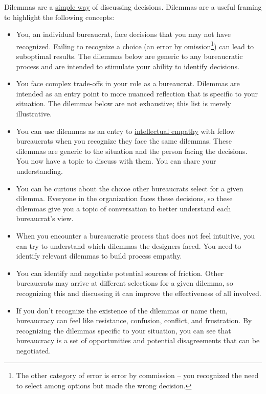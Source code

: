 Dilemmas are a \href{https://en.wikipedia.org/wiki/Defeasible_reasoning}{simple way}
\iftoggle{WPinmargin}{\marginpar{$>$Wikipedia: Defeasible\\reasoning}}{}
of discussing decisions. %
Dilemmas are a useful framing to highlight the following concepts:
\begin{itemize}
    \item You, an individual bureaucrat, face decisions that you may not have recognized. Failing to recognize a choice (an error by omission\footnote{The other category of error is error by commission -- you recognized the need to select among options but made the wrong decision.}) can lead to suboptimal results. The dilemmas below are generic to any bureaucratic process and are intended to stimulate your ability to identify decisions. 
    \item You face complex trade-offs in your role as a bureaucrat. Dilemmas are intended as an entry point to more nuanced reflection that is specific to your situation. The dilemmas below are not exhaustive; this list is merely illustrative. 
    \item You can use dilemmas as an entry to \href{https://en.wikipedia.org/wiki/Theory_of_mind}{intellectual empathy} 
    \iftoggle{WPinmargin}{\marginpar{$>$Wikipedia: Theory\\of mind}}{}
    with fellow bureaucrats when you recognize they face the same dilemmas. These dilemmas are generic to the situation and the person facing the decisions. You now have a topic to discuss with them. You can share your understanding. 
    \item You can be curious about the choice other bureaucrats select for a given dilemma. Everyone in the organization faces these decisions, so these dilemmas give you a topic of conversation to better understand each bureaucrat's view.
    \item When you encounter a bureaucratic process that does not feel intuitive, 
    you can try to understand which dilemmas the designers faced. 
    You need to identify relevant dilemmas to build \gls{process empathy}. \iftoggle{glossaryinmargin}{\marginpar{[Glossary]}}{}
    \item You can identify and negotiate potential sources of friction. Other bureaucrats may arrive at different selections for a given dilemma, so recognizing this and discussing it can improve the effectiveness of all involved.
    \item If you don't recognize the existence of the dilemmas or name them, bureaucracy can feel like resistance, confusion, conflict, and frustration. By recognizing the dilemmas specific to your situation, you can see that bureaucracy is  a set of opportunities and potential disagreements that can be negotiated.
\end{itemize}


